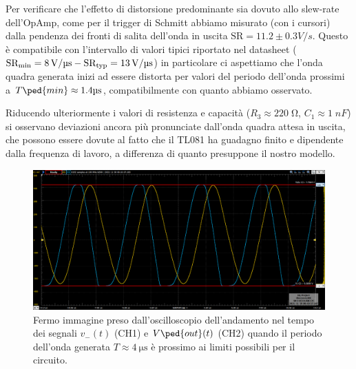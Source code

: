 \documentclass[10pt, a4paper, italian]{article}
\begin{document}
Per verificare che l'effetto di distorsione predominante sia dovuto allo
slew-rate dell'OpAmp, come per il trigger di Schmitt abbiamo misurato (con
i cursori) dalla pendenza dei fronti di salita dell'onda in uscita
$\mathrm{SR} = 11.2 \pm 0.3 \si{V/s}$. Questo è compatibile con l'intervallo
di valori tipici riportato nel datasheet
($\rm SR_{min} = \SI{8}{\V/\micro\s} - SR_{typ} = \SI{13}{\V/\micro\s}$)
in particolare ci aspettiamo che l'onda quadra generata inizi ad essere
distorta per valori del periodo dell'onda prossimi a
$T\ped{min} \approx 1.4 \si{\micro\s}$, compatibilmente con quanto abbiamo
osservato.

Riducendo ulteriormente i valori di resistenza e capacità
($R_3 \approx 220 \; \si{\ohm}$, $C_1 \approx 1 \; \si{nF}$) si osservano
deviazioni ancora più pronunciate dall'onda quadra attesa in uscita, che
possono essere dovute al fatto che il TL081 ha guadagno finito e dipendente
dalla frequenza di lavoro, a differenza di quanto presuppone il nostro modello. 
\begin{figure}[htbp]
\centering
\includegraphics[scale=0.5]{astable(C=1 nF, R= 220 ohm)}
\caption{Fermo immagine preso dall'oscilloscopio dell'andamento nel tempo dei
segnali $v_- (t)$ (CH1) e $V\ped{out} (t)$ (CH2) quando il periodo dell'onda
generata $T \approx \SI{4}{\micro\s}$ è prossimo ai limiti possibili per il
circuito. \label{fig: astable_lim}}
\end{figure}

\end{document}
